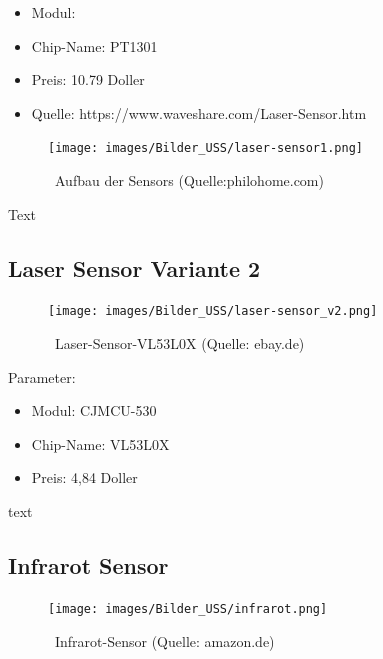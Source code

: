 \begin{itemize}
\item Modul: 
\item Chip-Name: PT1301
\item Preis: 10.79 Doller
\item Quelle: https://www.waveshare.com/Laser-Sensor.htm
\end{itemize}


\begin{figure}[h]  %
	\centering\texttt{[image: images/Bilder\_USS/laser-sensor1.png]}
	\caption{ \ Aufbau der Sensors (Quelle:philohome.com)}
	\label{laser-sensor1} %
\end{figure}

Text

\newpage
\subsection{Laser Sensor Variante 2}

\begin{figure}[h]  %
	\centering\texttt{[image: images/Bilder\_USS/laser-sensor\_v2.png]}
	\caption{ \ Laser-Sensor-VL53L0X (Quelle: ebay.de)}
	\label{laser-sensor_v2} %
\end{figure}

Parameter:
\begin{itemize}

\item Modul: CJMCU-530
\item Chip-Name: VL53L0X
\item Preis: 4,84 Doller
\end{itemize}



text

\newpage
\subsection{Infrarot Sensor}

\begin{figure}[h]  %
	\centering\texttt{[image: images/Bilder\_USS/infrarot.png]}
	\caption{ \ Infrarot-Sensor  (Quelle: amazon.de)}
	\label{infrarot} %
\end{figure}

